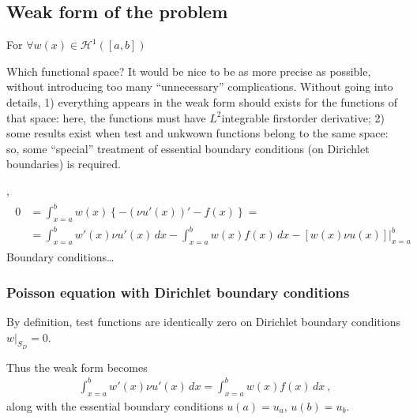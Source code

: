 \documentclass[letterpaper,10pt,english]{jupyterBook}
\begin{document}
\subsection{Weak form of the problem}
\label{\detokenize{ch/pde/fem-poisson-1d:weak-form-of-the-problem}}
\sphinxAtStartPar
For \(\forall w(x) \in \mathscr{H}^1([a,b])\)%
\begin{footnote}[1]\sphinxAtStartFootnote
Which functional space? It would be nice to be as more precise as possible, without introducing too many “unnecessary” complications. Without going into details, 1) everything appears in the weak form should exists for the functions of that space: here, the functions must have \(L^2\)\sphinxhyphen{}integrable first\sphinxhyphen{}order derivative; 2) some results exist when test and unkwown functions belong to the same space: so, some “special” treatment of essential boundary conditions (on Dirichlet boundaries) is required.
%
\end{footnote} ,
\begin{equation*}
\begin{split}\begin{aligned}
  0 
  & = \int_{x=a}^b w(x) \left\{ - \left( \nu u'(x) \right)' - f(x) \right\} =  \\
  & = \int_{x=a}^b  w'(x) \nu u'(x) \, dx - \int_{x=a}^b w(x) f(x) \, dx - \left.\left[ w(x) \nu u(x) \right]\right|_{x=a}^b
\end{aligned}\end{split}
\end{equation*}
\sphinxAtStartPar
Boundary conditions…


\subsubsection{Poisson equation with Dirichlet boundary conditions}
\label{\detokenize{ch/pde/fem-poisson-1d:poisson-equation-with-dirichlet-boundary-conditions}}
\sphinxAtStartPar
By definition, test functions are identically zero on Dirichlet boundary conditions \(\left.w\right|_{S_D} = 0\).

\sphinxAtStartPar
Thus the weak form becomes
\begin{equation*}
\begin{split}
 \int_{x=a}^b  w'(x) \nu u'(x) \, dx = \int_{x=a}^b w(x) f(x) \, dx \ ,
\end{split}
\end{equation*}
\sphinxAtStartPar
along with the essential boundary conditions \(u(a) = u_a\), \(u(b) = u_b\).
\end{document}
